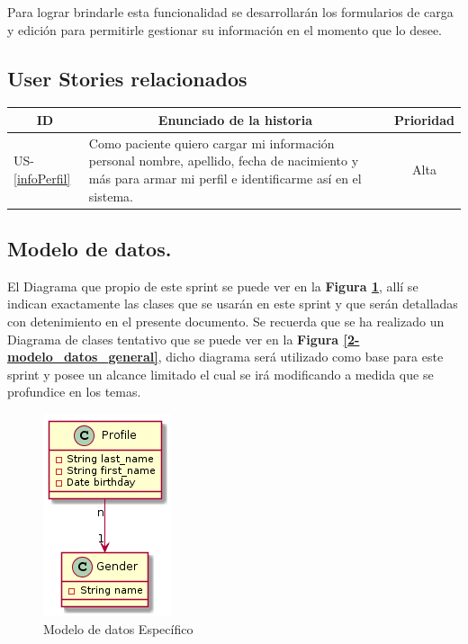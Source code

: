 Para lograr brindarle esta funcionalidad se desarrollarán los formularios de carga y edición para permitirle gestionar su información en el momento que lo desee.

\subsection{User Stories relacionados}
{\scriptsize
\begin{table}[h]
	\begin{tabular}{|l|p{10cm}|c|}
	\hline
        \multicolumn{1}{|c|}{\textbf{ID}} &
        \multicolumn{1}{|c|}{\textbf{Enunciado de la historia}} &
        \textbf{Prioridad} \\     
    \hline
        US-\ref{infoPerfil} &
        Como paciente quiero cargar mi información personal nombre, apellido, fecha de nacimiento y más para armar mi perfil e identificarme así en el sistema.& Alta
        \\
    \hline 
	 \end{tabular}
\end{table}
}




\subsection{ Modelo de datos.}

El Diagrama que propio de este sprint se puede ver en la \textbf{Figura \ref{modeloEspecifico}}, allí se indican exactamente las clases que se usarán en este sprint y que serán detalladas con detenimiento en el presente documento. Se recuerda que se ha realizado un Diagrama de clases tentativo que se puede ver en la \textbf{Figura \ref{2-modelo_datos_general}}, dicho diagrama  será utilizado como base para este sprint y posee un alcance limitado el cual se irá modificando a medida que se profundice en los temas.



\begin{figure}[h]
  \centering
  \includegraphics[width=.2\textwidth]{img/tp1_parte2/1-modelo_dato_especifico}
  \caption{Modelo de datos Específico}
  \label{modeloEspecifico}
\end{figure}
\clearpage

